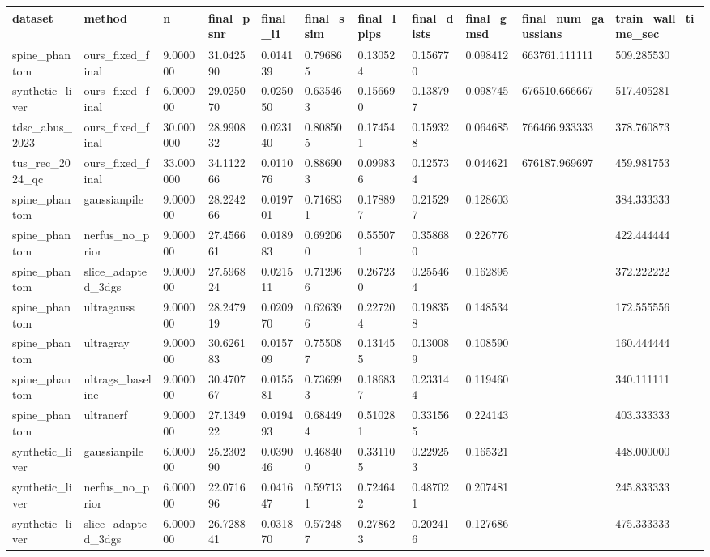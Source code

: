 \begin{tabular}{lllllllllll}
dataset & method & n & final\_psnr & final\_l1 & final\_ssim & final\_lpips & final\_dists & final\_gmsd & final\_num\_gaussians & train\_wall\_time\_sec \\
\hline
spine\_phantom & ours\_fixed\_final & 9.000000 & 31.042590 & 0.014139 & 0.796865 & 0.130524 & 0.156770 & 0.098412 & 663761.111111 & 509.285530 \\
synthetic\_liver & ours\_fixed\_final & 6.000000 & 29.025070 & 0.025050 & 0.635463 & 0.156690 & 0.138797 & 0.098745 & 676510.666667 & 517.405281 \\
tdsc\_abus\_2023 & ours\_fixed\_final & 30.000000 & 28.990832 & 0.023140 & 0.808505 & 0.174541 & 0.159328 & 0.064685 & 766466.933333 & 378.760873 \\
tus\_rec\_2024\_qc & ours\_fixed\_final & 33.000000 & 34.112266 & 0.011076 & 0.886903 & 0.099836 & 0.125734 & 0.044621 & 676187.969697 & 459.981753 \\
spine\_phantom & gaussianpile & 9.000000 & 28.224266 & 0.019701 & 0.716831 & 0.178897 & 0.215297 & 0.128603 &  & 384.333333 \\
spine\_phantom & nerfus\_no\_prior & 9.000000 & 27.456661 & 0.018983 & 0.692060 & 0.555071 & 0.358680 & 0.226776 &  & 422.444444 \\
spine\_phantom & slice\_adapted\_3dgs & 9.000000 & 27.596824 & 0.021511 & 0.712966 & 0.267230 & 0.255464 & 0.162895 &  & 372.222222 \\
spine\_phantom & ultragauss & 9.000000 & 28.247919 & 0.020970 & 0.626396 & 0.227204 & 0.198358 & 0.148534 &  & 172.555556 \\
spine\_phantom & ultragray & 9.000000 & 30.626183 & 0.015709 & 0.755087 & 0.131455 & 0.130089 & 0.108590 &  & 160.444444 \\
spine\_phantom & ultrags\_baseline & 9.000000 & 30.470767 & 0.015581 & 0.736993 & 0.186837 & 0.233144 & 0.119460 &  & 340.111111 \\
spine\_phantom & ultranerf & 9.000000 & 27.134922 & 0.019493 & 0.684494 & 0.510281 & 0.331565 & 0.224143 &  & 403.333333 \\
synthetic\_liver & gaussianpile & 6.000000 & 25.230290 & 0.039046 & 0.468400 & 0.331105 & 0.229253 & 0.165321 &  & 448.000000 \\
synthetic\_liver & nerfus\_no\_prior & 6.000000 & 22.071696 & 0.041647 & 0.597131 & 0.724642 & 0.487021 & 0.207481 &  & 245.833333 \\
synthetic\_liver & slice\_adapted\_3dgs & 6.000000 & 26.728841 & 0.031870 & 0.572487 & 0.278623 & 0.202416 & 0.127686 &  & 475.333333 \\

\end{tabular}
